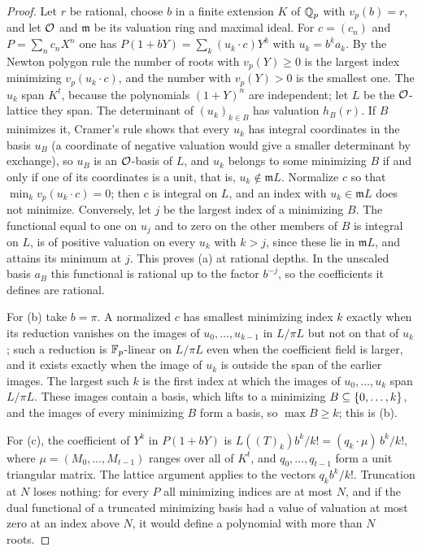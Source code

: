 \begin{proof}
Let $r$ be rational, choose $b$ in a finite extension $K$ of $\mathbb{Q}_p$ with $v_p(b)=r$, and let
$\mathcal{O}$ and $\mathfrak m$ be its valuation ring and maximal ideal. For $c=(c_n)$ and
$P=\sum_nc_nX^n$ one has $P(1+bY)=\sum_k(u_k\cdot c)Y^k$ with $u_k=b^ka_k$. By the Newton
polygon rule the number of roots with $v_p(Y)\ge0$ is the largest index minimizing
$v_p(u_k\cdot c)$, and the number with $v_p(Y)>0$ is the smallest one. The $u_k$ span $K^t$,
because the polynomials $(1+Y)^n$ are independent; let $L$ be the $\mathcal{O}$-lattice they span. The
determinant of $(u_k)_{k\in B}$ has valuation $h_B(r)$. If $B$ minimizes it, Cramer's rule
shows that every $u_k$ has integral coordinates in the basis $u_B$ (a coordinate of negative
valuation would give a smaller determinant by exchange), so $u_B$ is an $\mathcal{O}$-basis of $L$, and
$u_k$ belongs to some minimizing $B$ if and only if one of its coordinates is a unit, that is,
$u_k\notin\mathfrak mL$. Normalize $c$ so that $\min_kv_p(u_k\cdot c)=0$; then $c$ is integral
on $L$, and an index with $u_k\in\mathfrak mL$ does not minimize. Conversely, let $j$ be the
largest index of a minimizing $B$. The functional equal to one on $u_j$ and to zero on the other
members of $B$ is integral on $L$, is of positive valuation on every $u_k$ with $k>j$, since
these lie in $\mathfrak mL$, and attains its minimum at $j$. This proves (a) at rational
depths. In the unscaled basis $a_B$ this functional is rational up to the factor $b^{-j}$, so
the coefficients it defines are rational.

For (b) take $b=\pi$. A normalized $c$ has smallest minimizing index $k$ exactly when its
reduction vanishes on the images of $u_0,\dots,u_{k-1}$ in $L/\pi L$ but not on that of $u_k$;
such a reduction is $\mathbb{F}_p$-linear on $L/\pi L$ even when the coefficient field is larger, and
it exists exactly when the image of $u_k$ is outside the span of the earlier images. The
largest such $k$ is the first index at which the images of $u_0,\dots,u_k$ span $L/\pi L$.
These images contain a basis, which lifts to a minimizing $B\subseteq\{0,\dots,k\}$, and the
images of every minimizing $B$ form a basis, so $\max B\ge k$; this is (b).

For (c), the coefficient of $Y^k$ in $P(1+bY)$ is $L((T)_k)b^k/k!=(q_k\cdot\mu)\,b^k/k!$, where
$\mu=(M_0,\dots,M_{t-1})$ ranges over all of $K^t$, and $q_0,\dots,q_{t-1}$ form a unit
triangular matrix. The lattice argument applies to the vectors $q_kb^k/k!$. Truncation at $N$
loses nothing: for every $P$ all minimizing indices are at most $N$, and if the dual functional
of a truncated minimizing basis had a value of valuation at most zero at an index above $N$, it
would define a polynomial with more than $N$ roots.


\end{proof}
